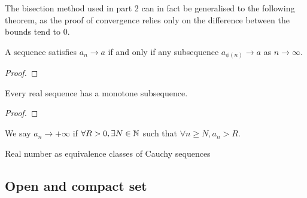 \documentclass[11pt]{article}
\begin{document}
The bisection method used in part 2 can in fact be generalised to the following theorem, as the proof of convergence relies only on the difference between the bounds tend to 0.

\begin{proposition}
  A sequence satisfies \(a_n\to a\) if and only if any subsequence \(a_{\phi(n)}\to a\)  as \(n\to\infty\).
\end{proposition}
\begin{proof}
  
\end{proof}

\begin{proposition}
  Every real sequence has a monotone subsequence.
\end{proposition}
\begin{proof}
  
\end{proof}

\begin{definition}
  We say \(a_n\to +\infty\) if \(\forall R>0,\exists N\in\mathbb{N}\) such that \(\forall n\geq N,a_n>R\).
\end{definition}

\begin{extension}{Real number as equivalence classes of Cauchy sequences}
  
\end{extension}

\subsection{Open and compact set}
\begin{definition}
  
\end{definition}
\begin{definition}
  
\end{definition}
\end{document}
